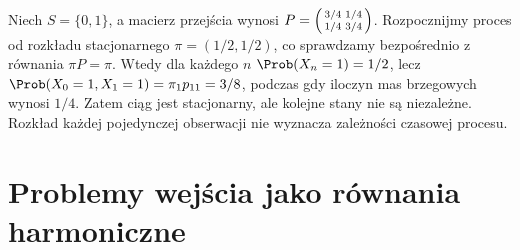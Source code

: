 \begin{przyklad}
Niech $S=\{0,1\}$, a macierz przejścia wynosi
$P=\begin{psmallmatrix}3/4&1/4\\1/4&3/4\end{psmallmatrix}$.
Rozpocznijmy proces od rozkładu stacjonarnego
$\pi=(1/2,1/2)$, co sprawdzamy bezpośrednio
z równania $\pi P=\pi$. Wtedy dla każdego $n$
$\Prob(X_n=1)=1/2$, lecz
$\Prob(X_0=1,X_1=1)=\pi_1p_{11}=3/8$,
podczas gdy iloczyn mas brzegowych wynosi $1/4$.
Zatem ciąg jest stacjonarny, ale kolejne stany
nie są niezależne. Rozkład każdej pojedynczej obserwacji
nie wyznacza zależności czasowej procesu.
\end{przyklad}

\section{Problemy wejścia jako równania harmoniczne}

